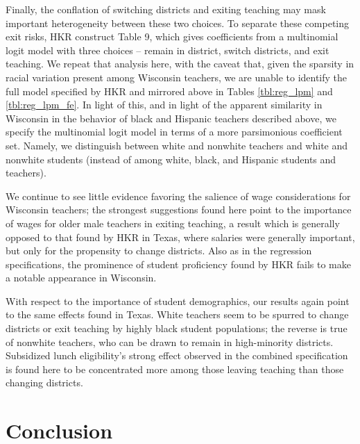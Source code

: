 \documentclass[12pt,]{article}
\begin{document}
Finally, the conflation of switching districts and exiting teaching may
mask important heterogeneity between these two choices. To separate
these competing exit risks, HKR construct Table 9, which gives
coefficients from a multinomial logit model with three choices -- remain
in district, switch districts, and exit teaching. We repeat that
analysis here, with the caveat that, given the sparsity in racial
variation present among Wisconsin teachers, we are unable to identify
the full model specified by HKR and mirrored above in Tables
\ref{tbl:reg_lpm} and \ref{tbl:reg_lpm_fe}. In light of this, and in
light of the apparent similarity in Wisconsin in the behavior of black
and Hispanic teachers described above, we specify the multinomial logit
model in terms of a more parsimonious coefficient set. Namely, we
distinguish between white and nonwhite teachers and white and nonwhite
students (instead of among white, black, and Hispanic students and
teachers).

We continue to see little evidence favoring the salience of wage
considerations for Wisconsin teachers; the strongest suggestions found
here point to the importance of wages for older male teachers in exiting
teaching, a result which is generally opposed to that found by HKR in
Texas, where salaries were generally important, but only for the
propensity to change districts. Also as in the regression
specifications, the prominence of student proficiency found by HKR fails
to make a notable appearance in Wisconsin.

With respect to the importance of student demographics, our results
again point to the same effects found in Texas. White teachers seem to
be spurred to change districts or exit teaching by highly black student
populations; the reverse is true of nonwhite teachers, who can be drawn
to remain in high-minority districts. Subsidized lunch eligibility's
strong effect observed in the combined specification is found here to be
concentrated more among those leaving teaching than those changing
districts.

\section{Conclusion}\label{conclusion}
\end{document}
